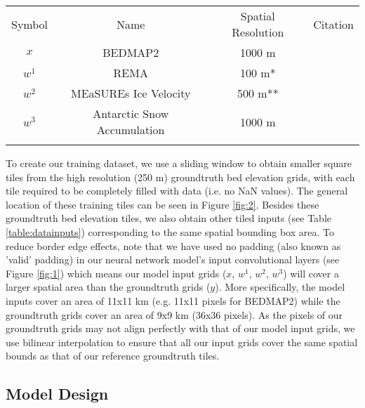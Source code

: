 \documentclass[tc, manuscript]{copernicus}
\begin{document}
\begin{table*}[htbp]
  \caption{Remote Sensing dataset inputs into the DeepBedMap neural network model.}
  \label{table:datainputs}
  \begin{tabular}{cccc}
  \tophline
  Symbol & Name & Spatial Resolution & Citation \\
  \middlehline
  $x$ & BEDMAP2 & 1000 m & \cite{FretwellBedmap2improvedice2013} \\
  $w^1$ & REMA & 100 m* & \cite{HowatReferenceElevationModel2019} \\
  $w^2$ & MEaSUREs Ice Velocity & 500 m** & \cite{MouginotContinentwideinterferometric2019} \\
  $w^3$ & Antarctic Snow Accumulation & 1000 m & \cite{ArthernAntarcticsnowaccumulation2006} \\
  \bottomhline
  \end{tabular}
\end{table*}

To create our training dataset, we use a sliding window to obtain smaller square tiles from the high resolution (250 m) groundtruth bed elevation grids, with each tile required to be completely filled with data (i.e. no NaN values).
The general location of these training tiles can be seen in Figure \ref{fig:2}.
Besides these groundtruth bed elevation tiles, we also obtain other tiled inputs (see Table \ref{table:datainputs}) corresponding to the same spatial bounding box area.
To reduce border edge effects, note that we have used no padding (also known as 'valid' padding) in our neural network model's input convolutional layers (see Figure \ref{fig:1}) which means our model input grids ($x$, $w^1$, $w^2$, $w^3$) will cover a larger spatial area than the groundtruth grids ($y$).
More specifically, the model inputs cover an area of 11x11 km (e.g. 11x11 pixels for BEDMAP2) while the groundtruth grids cover an area of 9x9 km (36x36 pixels).
As the pixels of our groundtruth grids may not align perfectly with that of our model input grids, we use bilinear interpolation to ensure that all our input grids cover the same spatial bounds as that of our reference groundtruth tiles.

\subsection{Model Design}
\end{document}
